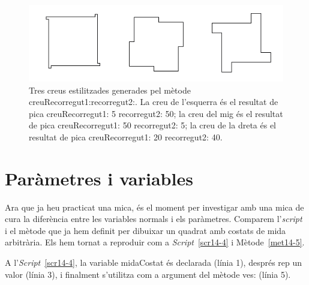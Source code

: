 \begin{figure}
\begin{center}
\includegraphics[scale=0.75]{Imatges/figura14-1.png}
\end{center}
\caption{Tres creus estilitzades generades pel mètode \textsf{\upshape creuRecorregut1:recorregut2:}. La creu de l'esquerra és el resultat de  \textsf{\upshape pica creuRecorregut1: 5 recorregut2: 50}; la creu del mig és el resultat de  \textsf{\upshape pica creuRecorregut1: 50 recorregut2: 5};  la creu de la dreta és el resultat de  \textsf{\upshape pica creuRecorregut1: 20 recorregut2: 40}.}
\label{fig1401}
\end{figure}

\section{Paràmetres i variables}
Ara que ja heu practicat una mica, és el moment per investigar amb una mica de cura la diferència entre les variables normals i els paràmetres. Comparem l'\emph{script} i el mètode que ja hem definit per dibuixar un quadrat amb costats de mida arbitrària. Els hem tornat a reproduir com a \emph{Script}~\ref{scr14-4} i Mètode~\ref{met14-5}.

A l'\emph{Script}~\ref{scr14-4}, la variable \textsf{midaCostat} és declarada (línia 1), després rep un valor (línia 3), i finalment s'utilitza com a argument del mètode \textsf{ves:} (línia 5). 

